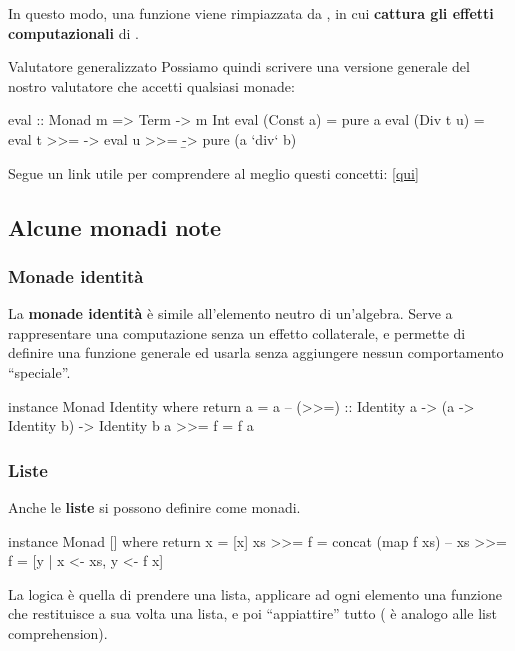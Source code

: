 In questo modo, una funzione  viene rimpiazzata da , in cui  \textbf{cattura gli effetti computazionali} di .

\begin{gframe}{Valutatore generalizzato}
    Possiamo quindi scrivere una versione generale del nostro valutatore che accetti qualsiasi monade:
\begin{haskellbox}{}
eval :: Monad m => Term -> m Int
eval (Const a) = pure a
eval (Div t u) = eval t >>= \a ->
                 eval u >>= \b ->
                 pure (a `div` b)
\end{haskellbox}
\end{gframe}

Segue un link utile per comprendere al meglio questi concetti: \href{https://www.adit.io/posts/2013-04-17-functors,_applicatives,_and_monads_in_pictures.html}{[qui]}

\subsection{Alcune monadi note}

\subsubsection{Monade identità}
La \textbf{monade identità} è simile all'elemento neutro di un'algebra. Serve a rappresentare una computazione senza un effetto collaterale, e permette di definire una funzione generale ed usarla senza aggiungere nessun comportamento ``speciale''.

\begin{haskellbox}{}
instance Monad Identity where
    return a = a
  -- (>>=)  :: Identity a -> (a -> Identity b) -> Identity b
    a >>= f = f a
\end{haskellbox}

\subsubsection{Liste}
Anche le \textbf{liste} si possono definire come monadi.
\begin{haskellbox}{}
instance Monad [] where
    return x = [x]
    xs >>= f = concat (map f xs)
    -- xs >>= f = [y | x <- xs, y <- f x]
\end{haskellbox}

La logica è quella di prendere una lista, applicare ad ogni elemento una funzione che restituisce a sua volta una lista, e poi ``appiattire'' tutto (\code{>>=} è analogo alle list comprehension).

